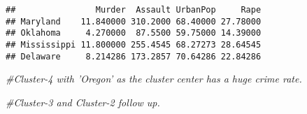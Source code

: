 \documentclass[]{article}
\newenvironment{Shaded}{\begin{snugshade}}{\end{snugshade}}
\newcommand{\CommentTok}[1]{\textcolor[rgb]{0.56,0.35,0.01}{\textit{#1}}}
\begin{document}
\begin{verbatim}
##                Murder  Assault UrbanPop     Rape
## Maryland    11.840000 310.2000 68.40000 27.78000
## Oklahoma     4.270000  87.5500 59.75000 14.39000
## Mississippi 11.800000 255.4545 68.27273 28.64545
## Delaware     8.214286 173.2857 70.64286 22.84286
\end{verbatim}

\begin{Shaded}
\begin{Highlighting}[]
\CommentTok{#Cluster-4 with 'Oregon' as the cluster center has a huge crime rate.}

\CommentTok{#Cluster-3 and Cluster-2 follow up.}
\end{Highlighting}
\end{Shaded}
\end{document}
